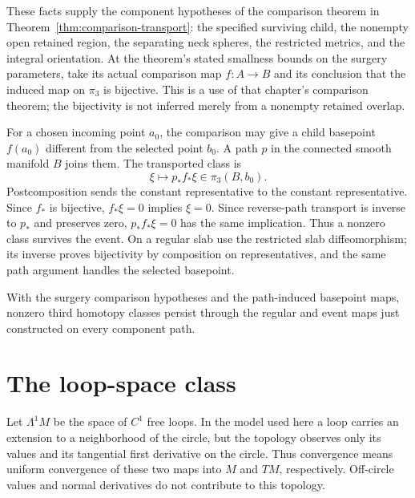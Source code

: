 These facts supply the component hypotheses of the comparison theorem
in Theorem~\ref{thm:comparison-transport}: the specified surviving child, the
nonempty open retained region, the separating neck spheres, the
restricted metrics, and the integral orientation. At the theorem's
stated smallness bounds on the surgery parameters, take its actual
comparison map $f:A\to B$ and its conclusion that the induced map on
$\pi_3$ is bijective. This is a use of that chapter's comparison theorem;
the bijectivity is not inferred merely from a nonempty retained overlap.

For a chosen incoming point $a_0$, the comparison may give a child
basepoint $f(a_0)$ different from the selected point $b_0$. A path $p$
in the connected smooth manifold $B$ joins them. The transported class
is
\[
 \xi\longmapsto p_*f_*\xi\in\pi_3(B,b_0).
\]
Postcomposition sends the constant representative to the constant
representative. Since $f_*$ is bijective, $f_*\xi=0$ implies $\xi=0$.
Since reverse-path transport is inverse to $p_*$ and preserves zero,
$p_*f_*\xi=0$ has the same implication. Thus a nonzero class survives
the event. On a regular slab use the restricted slab diffeomorphism;
its inverse proves bijectivity by composition on representatives, and
the same path argument handles the selected basepoint.

\begin{proposition}
\label{prop:filling-ancestry-transport}
With the surgery comparison hypotheses and the path-induced basepoint
maps, nonzero third homotopy classes persist through the regular and
event maps just constructed on every component path.
\end{proposition}

\section{The loop-space class}
\label{sec:filling-loop-class}

Let $\Lambda^1M$ be the space of $C^1$ free loops. In the model used here a
loop carries an extension to a neighborhood of the circle, but the topology
observes only its values and its tangential first derivative on the circle.
Thus convergence means uniform convergence of these two maps into $M$ and
$TM$, respectively. Off-circle values and normal derivatives do not
contribute to this topology.

